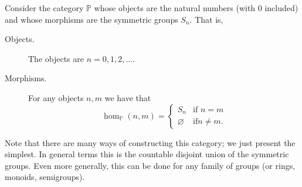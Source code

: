 \begin{example}\label{example:permutation_category}
    Consider the category $\mathbb{P}$ whose objects are the natural numbers 
    (with 0 included) and whose morphisms are the symmetric groups $S_n$. That is, 
    \begin{description}
        \item[Objects.] The objects are $n = 0, 1,2, \dots$.
        \item[Morphisms.] For any objects $n,m$ we have that 
        \[
            \hom_{\mathbb{P}}(n,m)=
            \begin{cases}
                S_n & \text{if } n = m\\
                \varnothing & \text{if} n \ne m.
            \end{cases}
        \]
    \end{description}
    Note that there are many ways of constructing this category; we just present the 
    simplest. In general terms this is the countable disjoint union of the symmetric groups. 
    Even more generally, this can be done for any family of groups (or rings, monoids, semigroups). 


\end{example}
